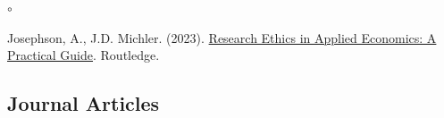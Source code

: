 \documentclass[letterpaper]{article}
\begin{document}
\renewenvironment{itemize}{
	\begin{list}{$\circ$}{
			\setlength{\leftmargin}{1.5em}
		}
	}{
	\end{list}
}

\begin{itemize}
	
	\item Josephson, A., J.D. Michler. (2023). \href{https://www.routledge.com/Research-Ethics-in-Applied-Economics-A-Practical-Guide/Josephson-Michler/p/book/9780367457419}{Research Ethics in Applied Economics: A Practical Guide}. Routledge. 
	
\end{itemize}


\subsection*{Journal Articles}
\end{document}
